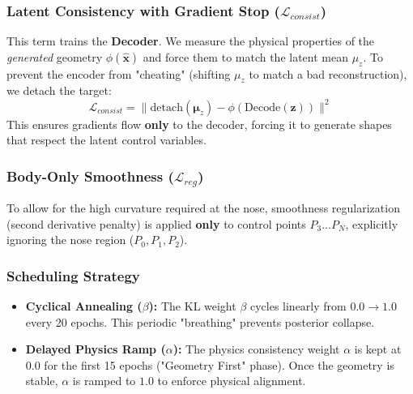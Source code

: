 \documentclass[11pt, a4paper]{article}
\begin{document}
\subsubsection{Latent Consistency with Gradient Stop ($\mathcal{L}_{consist}$)}
This term trains the \textbf{Decoder}. We measure the physical properties of the \textit{generated} geometry $\phi(\hat{\mathbf{x}})$ and force them to match the latent mean $\mu_z$. To prevent the encoder from "cheating" (shifting $\mu_z$ to match a bad reconstruction), we detach the target:
\begin{equation}
    \mathcal{L}_{consist} = \| \text{detach}(\mathbf{\mu}_{z}) - \phi(\text{Decode}(\mathbf{z})) \|^2
\end{equation}
This ensures gradients flow \textbf{only} to the decoder, forcing it to generate shapes that respect the latent control variables.

\subsubsection{Body-Only Smoothness ($\mathcal{L}_{reg}$)}
To allow for the high curvature required at the nose, smoothness regularization (second derivative penalty) is applied \textbf{only} to control points $P_3 \dots P_N$, explicitly ignoring the nose region ($P_0, P_1, P_2$).

\subsubsection{Scheduling Strategy}
\begin{itemize}
    \item \textbf{Cyclical Annealing ($\beta$):} The KL weight $\beta$ cycles linearly from $0.0 \to 1.0$ every 20 epochs. This periodic "breathing" prevents posterior collapse.
    \item \textbf{Delayed Physics Ramp ($\alpha$):} The physics consistency weight $\alpha$ is kept at 0.0 for the first 15 epochs ("Geometry First" phase). Once the geometry is stable, $\alpha$ is ramped to $1.0$ to enforce physical alignment.
\end{itemize}
\end{document}
